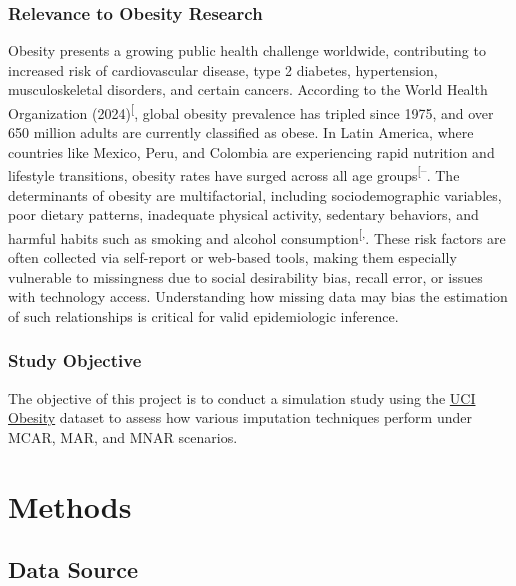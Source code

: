\documentclass[
  letterpaper,
  DIV=11,
  numbers=noendperiod]{scrartcl}
\begin{document}
\subsubsection{Relevance to Obesity
Research}\label{relevance-to-obesity-research}

Obesity presents a growing public health challenge worldwide,
contributing to increased risk of cardiovascular disease, type 2
diabetes, hypertension, musculoskeletal disorders, and certain cancers.
According to the World Health Organization
(2024)\textsuperscript{{[}\citeproc{ref-world2024obesity}{9}{]}}, global
obesity prevalence has tripled since 1975, and over 650 million adults
are currently classified as obese. In Latin America, where countries
like Mexico, Peru, and Colombia are experiencing rapid nutrition and
lifestyle transitions, obesity rates have surged across all age
groups\textsuperscript{{[}--\citeproc{ref-food2019drink}{12}{]}}.
The determinants of obesity are multifactorial, including
sociodemographic variables, poor dietary patterns, inadequate physical
activity, sedentary behaviors, and harmful habits such as smoking and
alcohol
consumption\textsuperscript{{[},\citeproc{ref-de2019obesity}{14}{]}}.
These risk factors are often collected via self-report or web-based
tools, making them especially vulnerable to missingness due to social
desirability bias, recall error, or issues with technology access.
Understanding how missing data may bias the estimation of such
relationships is critical for valid epidemiologic inference.

\subsubsection{Study Objective}\label{study-objective}

The objective of this project is to conduct a simulation study using the
\href{https://archive.ics.uci.edu/dataset/544/estimation+of+obesity+levels+based+on+eating+habits+and+physical+condition}{UCI
Obesity} dataset to assess how various imputation techniques perform
under MCAR, MAR, and MNAR scenarios.

\newpage

\section{Methods}\label{methods}

\subsection{Data Source}\label{data-source}
\end{document}
